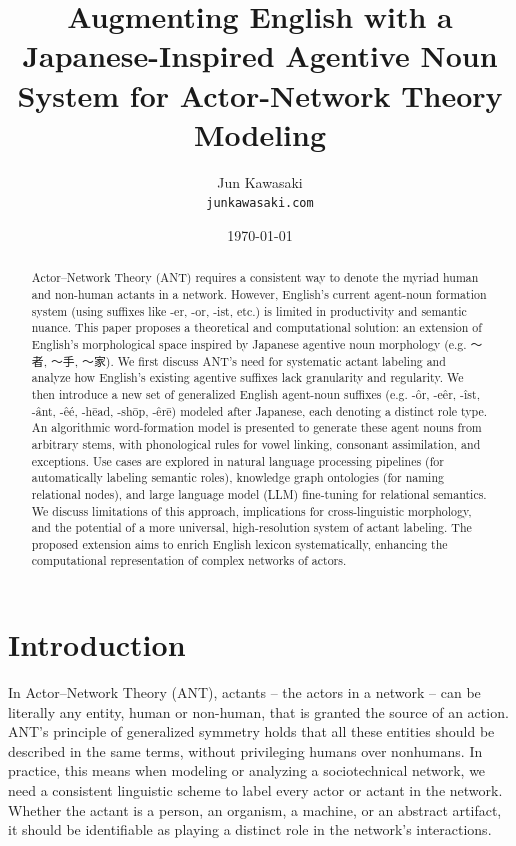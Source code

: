 \documentclass[11pt]{article}
\title{Augmenting English with a Japanese-Inspired Agentive Noun System for Actor-Network Theory Modeling}
\author{Jun Kawasaki\\
\texttt{junkawasaki.com}}
\date{\today}
\begin{document}
\maketitle

\begin{abstract}
Actor–Network Theory (ANT) requires a consistent way to denote the myriad human and non-human actants in a network. However, English's current agent-noun formation system (using suffixes like -er, -or, -ist, etc.) is limited in productivity and semantic nuance. This paper proposes a theoretical and computational solution: an extension of English's morphological space inspired by Japanese agentive noun morphology (e.g. 〜者, 〜手, 〜家). We first discuss ANT's need for systematic actant labeling and analyze how English's existing agentive suffixes lack granularity and regularity. We then introduce a new set of generalized English agent-noun suffixes (e.g. -ôr, -eêr, -îst, -ânt, -êé, -hēad, -shōp, -êrē) modeled after Japanese, each denoting a distinct role type. An algorithmic word-formation model is presented to generate these agent nouns from arbitrary stems, with phonological rules for vowel linking, consonant assimilation, and exceptions. Use cases are explored in natural language processing pipelines (for automatically labeling semantic roles), knowledge graph ontologies (for naming relational nodes), and large language model (LLM) fine-tuning for relational semantics. We discuss limitations of this approach, implications for cross-linguistic morphology, and the potential of a more universal, high-resolution system of actant labeling. The proposed extension aims to enrich English lexicon systematically, enhancing the computational representation of complex networks of actors.
\end{abstract}

\section{Introduction}

In Actor–Network Theory (ANT), actants – the actors in a network – can be literally any entity, human or non-human, that is granted the source of an action. ANT's principle of generalized symmetry holds that all these entities should be described in the same terms, without privileging humans over nonhumans. In practice, this means when modeling or analyzing a sociotechnical network, we need a consistent linguistic scheme to label every actor or actant in the network. Whether the actant is a person, an organism, a machine, or an abstract artifact, it should be identifiable as playing a distinct role in the network's interactions.
\end{document}
